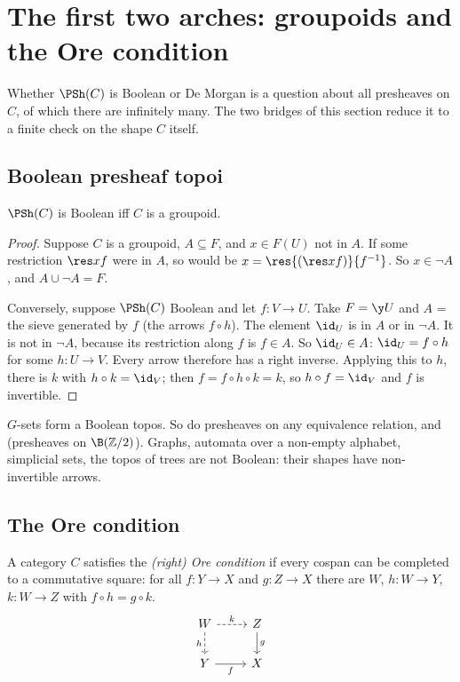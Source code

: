 \section{The first two arches: groupoids and the Ore condition}\label{sec:arches}

Whether $\PSh(C)$ is Boolean or De Morgan is a question about all presheaves on $C$, of which there are infinitely many. The two bridges of this section reduce it to a finite check on the shape $C$ itself.

\subsection{Boolean presheaf topoi}

\begin{bridge}[Boolean]\label{br:bool}
$\PSh(C)$ is Boolean iff $C$ is a groupoid.
\end{bridge}

\begin{proof}
Suppose $C$ is a groupoid, $A\subseteq F$, and $x\in F(U)$ not in $A$. If some restriction $\res xf$ were in $A$, so would be $x = \res{(\res xf)}{f^{-1}}$. So $x\in\neg A$, and $A\cup\neg A = F$.

Conversely, suppose $\PSh(C)$ Boolean and let $f : V\to U$. Take $F = \y U$ and $A$ = the sieve generated by $f$ (the arrows $f\circ h$). The element $\id_U$ is in $A$ or in $\neg A$. It is not in $\neg A$, because its restriction along $f$ is $f\in A$. So $\id_U\in A$: $\id_U = f\circ h$ for some $h : U\to V$. Every arrow therefore has a right inverse. Applying this to $h$, there is $k$ with $h\circ k = \id_V$; then $f = f\circ h\circ k = k$, so $h\circ f = \id_V$ and $f$ is invertible.
\end{proof}

\begin{example}
$G$-sets form a Boolean topos. So do presheaves on any equivalence relation, and  (presheaves on $\B(\mathbb Z/2)$). Graphs, automata over a non-empty alphabet, simplicial sets, the topos of trees are not Boolean: their shapes have non-invertible arrows.
\end{example}

\subsection{The Ore condition}

\begin{definition}
A category $C$ satisfies the \emph{(right) Ore condition} if every cospan can be completed to a commutative square: for all $f : Y\to X$ and $g : Z\to X$ there are $W$, $h : W\to Y$, $k : W\to Z$ with $f\circ h = g\circ k$.
\[
\begin{tikzcd}
W \arrow[r,dashed,"k"] \arrow[d,dashed,"h"'] & Z \arrow[d,"g"]\\
Y \arrow[r,"f"'] & X
\end{tikzcd}
\]
\end{definition}

